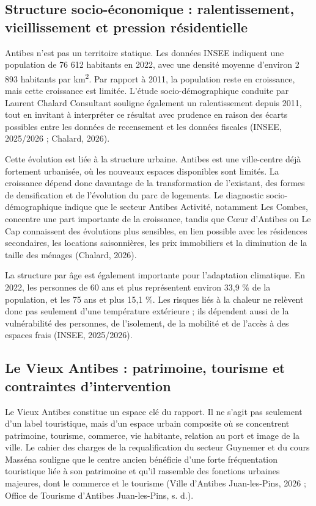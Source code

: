 \documentclass[11pt,a4paper]{report}
\begin{document}
\subsection{Structure socio-économique : ralentissement, vieillissement et pression résidentielle}

Antibes n'est pas un territoire statique. Les données INSEE indiquent une population de 76 612 habitants en 2022, avec une densité moyenne d'environ 2 893 habitants par km\textsuperscript{2}. Par rapport à 2011, la population reste en croissance, mais cette croissance est limitée. L'étude socio-démographique conduite par Laurent Chalard Consultant souligne également un ralentissement depuis 2011, tout en invitant à interpréter ce résultat avec prudence en raison des écarts possibles entre les données de recensement et les données fiscales (INSEE, 2025/2026 ; Chalard, 2026).

Cette évolution est liée à la structure urbaine. Antibes est une ville-centre déjà fortement urbanisée, où les nouveaux espaces disponibles sont limités. La croissance dépend donc davantage de la transformation de l'existant, des formes de densification et de l'évolution du parc de logements. Le diagnostic socio-démographique indique que le secteur Antibes Activité, notamment Les Combes, concentre une part importante de la croissance, tandis que Cœur d'Antibes ou Le Cap connaissent des évolutions plus sensibles, en lien possible avec les résidences secondaires, les locations saisonnières, les prix immobiliers et la diminution de la taille des ménages (Chalard, 2026).

La structure par âge est également importante pour l'adaptation climatique. En 2022, les personnes de 60 ans et plus représentent environ 33,9 \% de la population, et les 75 ans et plus 15,1 \%. Les risques liés à la chaleur ne relèvent donc pas seulement d'une température extérieure ; ils dépendent aussi de la vulnérabilité des personnes, de l'isolement, de la mobilité et de l'accès à des espaces frais (INSEE, 2025/2026).

\subsection{Le Vieux Antibes : patrimoine, tourisme et contraintes d'intervention}

Le Vieux Antibes constitue un espace clé du rapport. Il ne s'agit pas seulement d'un label touristique, mais d'un espace urbain composite où se concentrent patrimoine, tourisme, commerce, vie habitante, relation au port et image de la ville. Le cahier des charges de la requalification du secteur Guynemer et du cours Masséna souligne que le centre ancien bénéficie d'une forte fréquentation touristique liée à son patrimoine et qu'il rassemble des fonctions urbaines majeures, dont le commerce et le tourisme (Ville d'Antibes Juan-les-Pins, 2026 ; Office de Tourisme d'Antibes Juan-les-Pins, s. d.).
\end{document}
